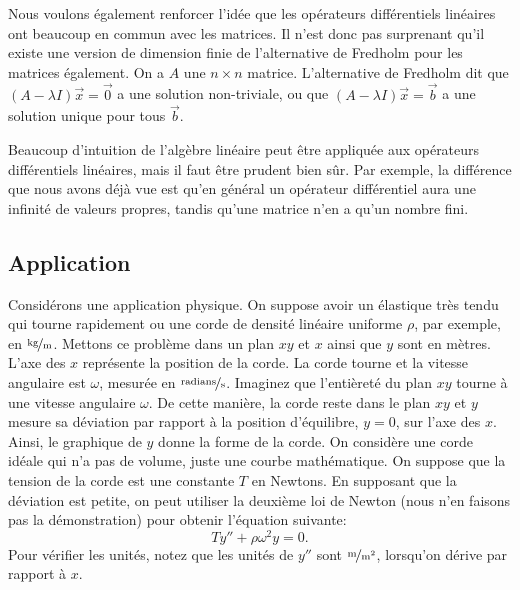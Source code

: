 Nous voulons également renforcer l'idée que les opérateurs différentiels linéaires ont
beaucoup en commun avec les matrices. Il n'est donc pas surprenant qu'il existe une version de dimension finie de l'alternative de Fredholm pour les matrices  également.  On a $A$ une $n \times n$ matrice.  L'alternative de Fredholm dit que $(A-\lambda I) \vec{x}
= \vec{0}$ a une solution non-triviale, ou que $(A-\lambda I) \vec{x} = \vec{b}$
a une solution unique pour tous $\vec{b}$.

Beaucoup d'intuition de l'algèbre linéaire peut être appliquée aux opérateurs différentiels linéaires, mais il faut être prudent bien sûr. Par exemple, la différence que nous avons déjà vue est qu'en général un opérateur différentiel
aura une infinité de valeurs propres, tandis qu'une matrice n'en a qu'un nombre fini.


\subsection{Application}

Considérons une application physique. On suppose avoir un élastique très tendu qui tourne rapidement ou une corde de densité linéaire uniforme $\rho$, par exemple, en
$\unitfrac{kg}{m}$.
Mettons ce problème dans un plan $xy$ et $x$ ainsi que $y$
sont en mètres.  L'axe des $x$ représente la position de la corde. La corde tourne et la vitesse angulaire est $\omega$, mesurée
en $\unitfrac{radians}{s}$.
Imaginez que l'entièreté du plan $xy$ tourne à une vitesse angulaire  $\omega$.
De cette manière, la corde reste dans le plan $xy$ et $y$ 
mesure sa déviation par rapport à la position d'équilibre, $y=0$, sur l'axe des $x$.
Ainsi, le graphique de $y$ donne la forme de la corde.
On considère une corde idéale qui n'a pas de volume, juste une courbe mathématique. On suppose que la tension de la corde est une constante $T$ en Newtons.
En supposant que la déviation est petite, on peut utiliser la deuxième loi de Newton (nous n'en faisons pas la démonstration) pour obtenir l'équation suivante: 
\begin{equation*}
T y'' + \rho \omega^2 y = 0 .
\end{equation*}
Pour vérifier les unités, notez que les unités de $y''$ sont $\unitfrac{m}{m^2}$, lorsqu'on dérive par rapport à $x$.

